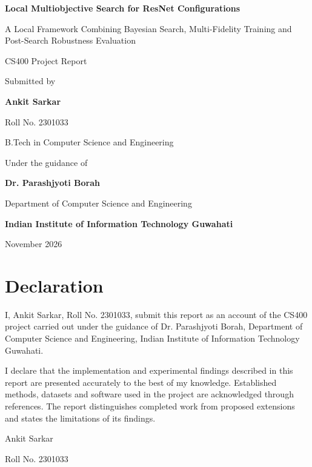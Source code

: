 \documentclass[11pt,a4paper,oneside]{report}
\begin{document}
\hypersetup{pageanchor=false}
\begin{titlepage}
\centering
\vspace*{12mm}
{\LARGE\bfseries Local Multiobjective Search for ResNet Configurations\par}
\vspace{8mm}
{\large A Local Framework Combining Bayesian Search, Multi-Fidelity Training and Post-Search Robustness Evaluation\par}
\vspace{14mm}
{\large CS400 Project Report\par}
\vspace{9mm}
Submitted by\par
{\large\bfseries Ankit Sarkar\par}
Roll No. 2301033\par
B.Tech in Computer Science and Engineering\par
\vspace{12mm}
Under the guidance of\par
{\large\bfseries Dr. Parashjyoti Borah\par}
Department of Computer Science and Engineering\par
\vfill
{\large\bfseries Indian Institute of Information Technology Guwahati\par}
\vspace{5mm}
November 2026
\end{titlepage}
\hypersetup{pageanchor=true}
\chapter*{Declaration}
{}
I, Ankit Sarkar, Roll No. 2301033, submit this report as an account of the CS400 project carried out under the guidance of Dr. Parashjyoti Borah, Department of Computer Science and Engineering, Indian Institute of Information Technology Guwahati.

I declare that the implementation and experimental findings described in this report are presented accurately to the best of my knowledge. Established methods, datasets and software used in the project are acknowledged through references. The report distinguishes completed work from proposed extensions and states the limitations of its findings.

\vspace{25mm}
Ankit Sarkar\par
Roll No. 2301033\par
\clearpage
\end{document}
